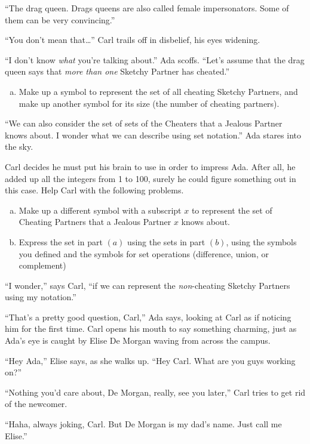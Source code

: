 \documentclass{article}
\begin{document}
``The drag queen. Drags queens are also called female impersonators.
Some of them can be very convincing.''

``You don't mean that\ldots'' Carl trails off in disbelief, his eyes
widening.

``I don't know \emph{what} you're talking about.'' Ada scoffs.
``Let's assume that the drag queen says that \emph{more than one}
Sketchy Partner has cheated.''

\begin{enumerate}[(a)]
\item
Make up a symbol to represent the set of all cheating Sketchy Partners,
and make up another symbol for its size (the number of cheating partners).
\end{enumerate}

``We can also consider the set of sets of the Cheaters that a
Jealous Partner knows about. I wonder what we can describe
using set notation.'' Ada stares into the sky.

Carl decides he must put his brain to use in order to impress
Ada. After all, he added up all the integers from 1 to
100, surely he could figure something out in this case.
Help Carl with the following problems.

\begin{enumerate}[(b)]
\item
Make up a different symbol with a subscript $x$ to represent the
set of Cheating Partners that a Jealous Partner $x$ knows about.
\item
Express the set in part $(a)$ using the sets in part $(b)$,
using the symbols you defined and the symbols for set operations
(difference, union, or complement)
\end{enumerate}

``I wonder,'' says Carl, ``if we can represent the
\emph{non}-cheating Sketchy Partners using my notation.''

``That's a pretty good question, Carl,'' Ada says,
looking at Carl as if noticing him for the first time.
Carl opens his mouth to say something charming, just
as Ada's eye is caught by Elise De Morgan waving from across
the campus.

``Hey Ada,'' Elise says, as she walks up. ``Hey Carl.
What are you guys working on?''

``Nothing you'd care about, De Morgan,
really, see you later,''
Carl tries to get rid of the newcomer.

``Haha, always joking, Carl. But De Morgan is my dad's name.
Just call me Elise.''
\end{document}
